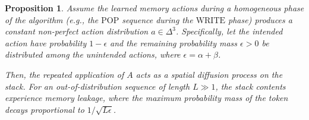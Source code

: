 \documentclass[11pt]{article}
\newtheorem{proposition}{Proposition}
\begin{document}
\begin{proposition}
Assume the learned memory actions during a homogeneous phase of the algorithm (e.g., the $\text{POP}$ sequence during the $\text{WRITE}$ phase) produces a constant non-perfect action distribution $a \in \Delta^3$. Specifically, let the intended action have probability $1-\epsilon$ and the remaining probability mass $\epsilon > 0$ be distributed among the unintended actions, where $\epsilon = \alpha + \beta$. 

Then, the repeated application of $A$ acts as a spatial diffusion process on the stack. For an out-of-distribution sequence of length $L \gg 1$, the stack contents experience memory leakage, where the maximum probability mass of the token decays proportional to $1/\sqrt{L\epsilon}$. 
\end{proposition}
\end{document}
